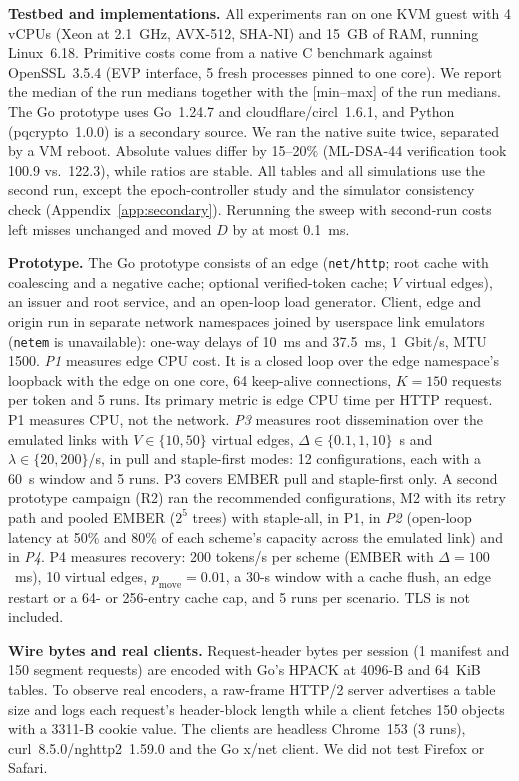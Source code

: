 \textbf{Testbed and implementations.} All experiments ran on one KVM guest with 4 vCPUs (Xeon at 2.1~GHz, AVX-512, SHA-NI) and 15~GB of RAM, running Linux~6.18. Primitive costs come from a native C benchmark against OpenSSL~3.5.4 (EVP interface, 5 fresh processes pinned to one core). We report the median of the run medians together with the [min--max] of the run medians. The Go prototype uses Go~1.24.7 and cloudflare/circl~1.6.1, and Python (pqcrypto~1.0.0) is a secondary source. We ran the native suite twice, separated by a VM reboot. Absolute values differ by 15--20\% (ML-DSA-44 verification took 100.9 vs.\ 122.3\us), while ratios are stable. All tables and all simulations use the second run, except the epoch-controller study and the simulator consistency check (Appendix~\ref{app:secondary}). Rerunning the sweep with second-run costs left misses unchanged and moved $D$ by at most 0.1~ms.

\textbf{Prototype.} The Go prototype consists of an edge (\texttt{net/http}; root cache with coalescing and a negative cache; optional verified-token cache; $V$ virtual edges), an issuer and root service, and an open-loop load generator. Client, edge and origin run in separate network namespaces joined by userspace link emulators (\texttt{netem} is unavailable): one-way delays of 10~ms and 37.5~ms, 1~Gbit/s, MTU 1500. \emph{P1} measures edge CPU cost. It is a closed loop over the edge namespace's loopback with the edge on one core, 64 keep-alive connections, $K=150$ requests per token and 5 runs. Its primary metric is edge CPU time per HTTP request. P1 measures CPU, not the network. \emph{P3} measures root dissemination over the emulated links with $V\in\{10,50\}$ virtual edges, $\Delta\in\{0.1,1,10\}$~s and $\lambda\in\{20,200\}$/s, in pull and staple-first modes: 12 configurations, each with a 60~s window and 5 runs. P3 covers EMBER pull and staple-first only. A second prototype campaign (R2) ran the recommended configurations, M2 with its retry path and pooled EMBER ($2^5$ trees) with staple-all, in P1, in \emph{P2} (open-loop latency at 50\% and 80\% of each scheme's capacity across the emulated link) and in \emph{P4}. P4 measures recovery: 200 tokens/s per scheme (EMBER with $\Delta=100$~ms), 10 virtual edges, $p_{\text{move}}=0.01$, a 30-s window with a cache flush, an edge restart or a 64- or 256-entry cache cap, and 5 runs per scenario. TLS is not included.

\textbf{Wire bytes and real clients.} Request-header bytes per session (1 manifest and 150 segment requests) are encoded with Go's HPACK at 4096-B and 64~KiB tables. To observe real encoders, a raw-frame HTTP/2 server advertises a table size and logs each request's header-block length while a client fetches 150 objects with a \num{3311}-B cookie value. The clients are headless Chrome~153 (3 runs), curl~8.5.0/nghttp2~1.59.0 and the Go x/net client. We did not test Firefox or Safari.


